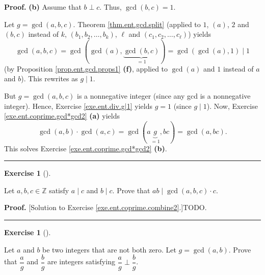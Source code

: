 \documentclass[numbers=enddot,12pt,final,onecolumn,notitlepage]{scrartcl}%
\newcounter{exer}
\numberwithin{exer}{subsection}
\theoremstyle{definition}
\newtheorem{exmp}[exer]{Exercise}
\newenvironment{exercise}[1][]
{\begin{exmp}[#1]\begin{leftbar}}
{\end{leftbar}\end{exmp}}
\newenvironment{proof}[1][Proof]{\noindent\textbf{#1.} }{\ \rule{0.5em}{0.5em}}
\begin{document}
\begin{proof}
\textbf{(b)} Assume that $b\perp c$. Thus, $\gcd\left(  b,c\right)  =1$.

Let $g=\gcd\left(  a,b,c\right)  $. Theorem \ref{thm.ent.gcd.split} (applied
to $1$, $\left(  a\right)  $, $2$ and $\left(  b,c\right)  $ instead of $k$,
$\left(  b_{1},b_{2},\ldots,b_{k}\right)  $, $\ell$ and $\left(  c_{1}%
,c_{2},\ldots,c_{\ell}\right)  $) yields%
\[
\gcd\left(  a,b,c\right)  =\gcd\left(  \gcd\left(  a\right)  ,\underbrace{\gcd
\left(  b,c\right)  }_{=1}\right)  =\gcd\left(  \gcd\left(  a\right)
,1\right)  \mid1
\]
(by Proposition \ref{prop.ent.gcd.props1} \textbf{(f)}, applied to
$\gcd\left(  a\right)  $ and $1$ instead of $a$ and $b$). This rewrites as
$g\mid1$.

But $g=\gcd\left(  a,b,c\right)  $ is a nonnegative integer (since any gcd is
a nonnegative integer). Hence, Exercise \ref{exe.ent.div.g|1} yields $g=1$
(since $g\mid1$). Now, Exercise \ref{exe.ent.coprime.gcd*gcd2} \textbf{(a)}
yields
\[
\gcd\left(  a,b\right)  \cdot\gcd\left(  a,c\right)  =\gcd\left(
a\underbrace{g}_{=1},bc\right)  =\gcd\left(  a,bc\right)  .
\]
This solves Exercise \ref{exe.ent.coprime.gcd*gcd2} \textbf{(b)}.
\end{proof}

\begin{exercise}
\label{exe.ent.coprime.combine2}Let $a,b,c\in\mathbb{Z}$ satisfy $a\mid c$ and
$b\mid c$. Prove that $ab\mid\gcd\left(  a,b,c\right)  \cdot c$.
\end{exercise}

\begin{proof}
[Solution to Exercise \ref{exe.ent.coprime.combine2}.]TODO.
\end{proof}

\begin{exercise}
\label{exe.ent.coprime.a/g}Let $a$ and $b$ be two integers that are not both
zero. Let $g=\gcd\left(  a,b\right)  $. Prove that $\dfrac{a}{g}$ and
$\dfrac{b}{g}$ are integers satisfying $\dfrac{a}{g}\perp\dfrac{b}{g}$.
\end{exercise}
\end{document}
